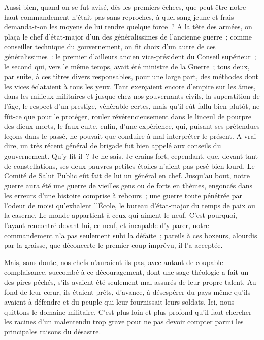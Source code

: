 \documentclass[french,twoside]{book} %
\newcommand\chapterclose{} %
\begin{document}
Aussi bien, quand on se fut avisé, dès les premiers échecs, que peut-être notre haut commandement n’était pas sans reproches, à quel sang jeune et frais demanda-t-on les moyens de lui rendre quelque force ? A la tête des armées, on plaça le chef d’état-major d’un des généralissimes de l’ancienne guerre ; comme conseiller technique du gouvernement, on fit choix d’un autre de ces généralissimes : le premier d’ailleurs ancien vice-président du Conseil supérieur ; le second qui, vers le même temps, avait été ministre de la Guerre ; tous deux, par suite, à ces titres divers responsables, pour une large part, des méthodes dont les vices éclataient à tous les yeux.   Tant exerçaient encore d’empire sur les âmes, dans les milieux militaires et jusque chez nos gouvernants civils, la superstition de l’âge, le respect d’un prestige, vénérable certes, mais qu’il eût fallu bien plutôt, ne fût‑ce que pour le protéger, rouler révé­rencieusement dans le linceul de pourpre des dieux morts, le faux culte, enfin, d’une expérience, qui, pui­sant ses prétendues leçons dans le passé, ne pouvait que conduire à mal interpréter le présent. A vrai dire, un très récent général de brigade fut bien appelé aux conseils du gouvernement. Qu’y fit‑il ? Je ne sais. Je crains fort, cependant, que, devant tant de constellations, ses deux pauvres petites étoiles n’aient pas pesé bien lourd. Le Comité de Salut Public eût fait de lui un général en chef. Jusqu’au bout, notre guerre aura été une guerre de vieilles gens ou de forts en thèmes, engoncés dans les erreurs d’une histoire comprise à rebours ; une guerre toute pénétrée par l’odeur de moisi qu’ex­halent l’École, le bureau d’état‑major du temps de paix ou la caserne. Le monde appartient à ceux qui aiment le neuf. C’est pourquoi, l’ayant rencontré devant lui, ce neuf, et incapable d’y parer, notre commandement n’a pas seulement subi la défaite ; pareils à ces boxeurs, alourdis par la graisse, que déconcerte le premier coup imprévu, il l’a acceptée.\par
Mais, sans doute, nos chefs n’auraient‑ils pas, avec autant de coupable complaisance, succombé à ce découragement, dont une sage théologie a fait un des pires péchés, s’ils avaient été seulement mal assurés de leur propre talent. Au fond de leur cœur, ils étaient prêts, d’avance, à désespérer du pays même qu’ils avaient à défendre et du peuple qui leur fournissait leurs soldats. Ici, nous quittons le domaine militaire. C’est plus loin et plus profond qu’il faut chercher les racines d’un malentendu trop grave pour ne pas devoir compter parmi les princi­pales raisons du désastre.
\chapterclose
\end{document}
